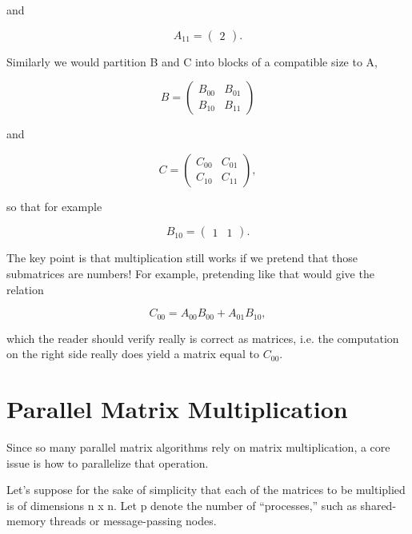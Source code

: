 and 

\begin{equation}
A_{11} =
\left (
\begin{array}{c}
2
\end{array}
\right ).
\end{equation}

Similarly we would partition B and C into blocks of a compatible size to A, 

\begin{equation}
B =
\left (
\begin{array}{cc}
B_{00} & B_{01} \\
B_{10} & B_{11}
\end{array}
\right )
\end{equation}

and 

\begin{equation}
C =
\left (
\begin{array}{cc}
C_{00} & C_{01} \\
C_{10} & C_{11}
\end{array}
\right ) ,
\end{equation}

so that for example 

\begin{equation}
B_{10} =
\left (
\begin{array}{cc}
1 & 1
\end{array}
\right ) .
\end{equation}

The key point is that multiplication still works if we pretend that
those submatrices are numbers!  For example, pretending like that would
give the relation

\begin{equation}
C_{00} = A_{00} B_{00} + A_{01} B_{10}, 
\end{equation}

which the reader should verify really is correct as matrices, i.e. the
computation on the right side really does yield a matrix equal to $C_{00}$.

\section{Parallel Matrix Multiplication}
\label{parmatmult}

Since so many parallel matrix algorithms rely on matrix multiplication,
a core issue is how to parallelize that operation.

Let's suppose for the sake of simplicity that each of the matrices to be
multiplied is of dimensions n x n.  Let p denote the number of
``processes,'' such as shared-memory threads or message-passing nodes.  

